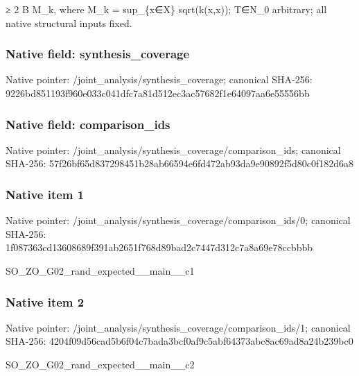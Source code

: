 \documentclass[10pt,a4paper]{article}
\begin{document}
\begingroup\raggedright{}\allowbreak{} {\AtlasUnicodeSymbols ≥}\allowbreak{} 2 B M\_\allowbreak{}k,\allowbreak{} where M\_\allowbreak{}k =\allowbreak{} sup\_\allowbreak{}\{x{\AtlasUnicodeSymbols ∈}\allowbreak{}X\} sqrt(k(x,\allowbreak{}x));\allowbreak{} T{\AtlasUnicodeSymbols ∈}\allowbreak{}N\_\allowbreak{}0 arbitrary;\allowbreak{} all native structural inputs fixed.\par\endgroup

\subsubsection{Native field: synthesis\_\allowbreak{}coverage}
Native pointer: /joint\_\allowbreak{}analysis/synthesis\_\allowbreak{}coverage; canonical SHA-256: 9226bd851193f960e033c041dfc7a81d512ec3ac57682f1e64097aa6e55556bb

\subsubsection{Native field: comparison\_\allowbreak{}ids}
Native pointer: /joint\_\allowbreak{}analysis/synthesis\_\allowbreak{}coverage/comparison\_\allowbreak{}ids; canonical SHA-256: 57f26bf65d837298451b28ab66594e6fd472ab93da9e90892f5d80c0f182d6a8

\subsubsection{Native item 1}
Native pointer: /joint\_\allowbreak{}analysis/synthesis\_\allowbreak{}coverage/comparison\_\allowbreak{}ids/0; canonical SHA-256: 1f087363cd13608689f391ab2651f768d89bad2c7447d312c7a8a69e78ccbbbb

\begingroup\raggedright\sloppy SO\_\allowbreak{}ZO\_\allowbreak{}G02\_\allowbreak{}rand\_\allowbreak{}expected\_\allowbreak{}\_\allowbreak{}main\_\allowbreak{}\_\allowbreak{}c1\par\endgroup

\subsubsection{Native item 2}
Native pointer: /joint\_\allowbreak{}analysis/synthesis\_\allowbreak{}coverage/comparison\_\allowbreak{}ids/1; canonical SHA-256: 4204f09d56cad5b6f04c7bada3bcf0af9c5abf64373abc8ac69ad8a24b239bc0

\begingroup\raggedright\sloppy SO\_\allowbreak{}ZO\_\allowbreak{}G02\_\allowbreak{}rand\_\allowbreak{}expected\_\allowbreak{}\_\allowbreak{}main\_\allowbreak{}\_\allowbreak{}c2\par\endgroup
\end{document}
